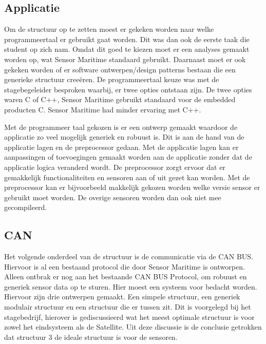 \subsection{Applicatie}
Om de structuur op te zetten moest er gekeken worden naar welke programmeertaal er gebruikt gaat worden. Dit was dan ook de eerste taak die student op zich nam. Omdat dit goed te kiezen moet er een analyses gemaakt worden op, wat Sensor Maritime standaard gebruikt. Daarnaast moet er ook gekeken worden of er software ontwerpen/design patterns bestaan die een generieke structuur creeëren. De programmeertaal keuze was met de stagebegeleider besproken waarbij, er twee opties ontstaan zijn. De twee opties waren C of C++, Sensor Maritime gebruikt standaard voor de embedded producten C. Sensor Maritime had minder ervaring met C++. \newline

\noindent Met de programmeer taal gekozen is er een ontwerp gemaakt waardoor de applicatie zo veel mogelijk generiek en robuust is. Dit is aan de hand van de applicatie lagen en de preprocessor gedaan. Met de applicatie lagen kan er aanpassingen of toevoegingen gemaakt worden aan de applicatie zonder dat de applicatie logica veranderd wordt. De preprocessor zorgt ervoor dat er gemakkelijk functionaliteiten en sensoren aan of uit gezet kan worden. Met de preprocessor kan er bijvoorbeeld makkelijk gekozen worden welke versie sensor er gebruikt moet worden. De overige sensoren worden dan ook niet mee gecompileerd.

\subsection{CAN}
Het volgende onderdeel van de structuur is de communicatie via de CAN BUS. Hiervoor is al een bestaand protocol die door Sensor Maritime is ontworpen. Alleen ontbrak er nog aan het bestaande CAN BUS Protocol, om robuust en generiek sensor data op te sturen. Hier moest een systeem voor bedacht worden. Hiervoor zijn drie ontwerpen gemaakt. Een simpele structuur, een generiek modulair structuur en een structuur die er tussen zit. Dit is voorgelegd bij het stagebedrijf, hierover is gediscussieerd wat het meest optimale structuur is voor zowel het eindsysteem als de Satellite. Uit deze discussie is de conclusie getrokken dat structuur 3 de ideale structuur is voor de sensoren.

